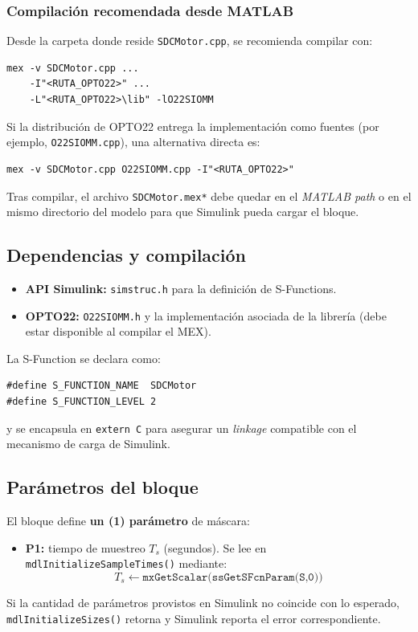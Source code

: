 \subsubsection{Compilación recomendada desde MATLAB}
Desde la carpeta donde reside \texttt{SDCMotor.cpp}, se recomienda compilar con:
\begin{verbatim}
mex -v SDCMotor.cpp ...
    -I"<RUTA_OPTO22>" ...
    -L"<RUTA_OPTO22>\lib" -lO22SIOMM
\end{verbatim}

\noindent Si la distribución de OPTO22 entrega la implementación como fuentes (por ejemplo, \texttt{O22SIOMM.cpp}), una alternativa directa es:
\begin{verbatim}
mex -v SDCMotor.cpp O22SIOMM.cpp -I"<RUTA_OPTO22>"
\end{verbatim}

\noindent Tras compilar, el archivo \texttt{SDCMotor.mex*} debe quedar en el \emph{MATLAB path} o en el mismo directorio del modelo para que Simulink pueda cargar el bloque.

\subsection{Dependencias y compilación}
\begin{itemize}
    \item \textbf{API Simulink:} \texttt{simstruc.h} para la definición de S-Functions.
    \item \textbf{OPTO22:} \texttt{O22SIOMM.h} y la implementación asociada de la librería (debe estar disponible al compilar el MEX).
\end{itemize}

\noindent La S-Function se declara como:
\begin{verbatim}
#define S_FUNCTION_NAME  SDCMotor
#define S_FUNCTION_LEVEL 2
\end{verbatim}
y se encapsula en \texttt{extern C} para asegurar un \emph{linkage} compatible con el mecanismo de carga de Simulink.

\subsection{Parámetros del bloque}
El bloque define \textbf{un (1) parámetro} de máscara:
\begin{itemize}
    \item \textbf{P1:} tiempo de muestreo $T_s$ (segundos). Se lee en \texttt{mdlInitializeSampleTimes()} mediante:
    \[
        T_s \leftarrow \texttt{mxGetScalar(ssGetSFcnParam(S,0))}
    \]
\end{itemize}
Si la cantidad de parámetros provistos en Simulink no coincide con lo esperado, \texttt{mdlInitializeSizes()} retorna y Simulink reporta el error correspondiente.

